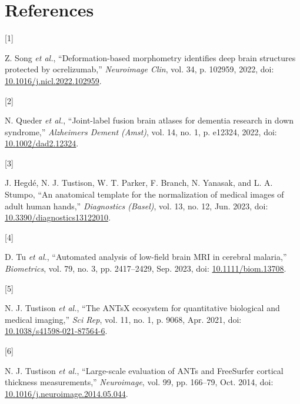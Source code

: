 \documentclass[
  11pt,
]{article}
\newlength{\cslhangindent}
\newlength{\csllabelwidth}
\newenvironment{CSLReferences}[2] %
 {%
  \setlength{\parindent}{0pt}
  \ifodd #1 \everypar{\setlength{\hangindent}{\cslhangindent}}\ignorespaces\fi
  \ifnum #2 > 0
  \setlength{\parskip}{#2\baselineskip}
  \fi
 }%
 {}
\newcommand{\CSLLeftMargin}[1]{\parbox[t]{\csllabelwidth}{#1}}
\newcommand{\CSLRightInline}[1]{\parbox[t]{\linewidth - \csllabelwidth}{#1}\break}
\begin{document}
\hypertarget{references}{%
\section*{References}\label{references}}

\hypertarget{refs}{}
\begin{CSLReferences}{0}{0}
\leavevmode{}%
\CSLLeftMargin{{[}1{]} }
\CSLRightInline{Z. Song \emph{et al.}, {``Deformation-based morphometry
identifies deep brain structures protected by ocrelizumab,''}
\emph{Neuroimage Clin}, vol. 34, p. 102959, 2022, doi:
\href{https://doi.org/10.1016/j.nicl.2022.102959}{10.1016/j.nicl.2022.102959}.}

\leavevmode{}%
\CSLLeftMargin{{[}2{]} }
\CSLRightInline{N. Queder \emph{et al.}, {``Joint-label fusion brain
atlases for dementia research in down syndrome,''} \emph{Alzheimers
Dement (Amst)}, vol. 14, no. 1, p. e12324, 2022, doi:
\href{https://doi.org/10.1002/dad2.12324}{10.1002/dad2.12324}.}

\leavevmode{}%
\CSLLeftMargin{{[}3{]} }
\CSLRightInline{J. Hegdé, N. J. Tustison, W. T. Parker, F. Branch, N.
Yanasak, and L. A. Stumpo, {``An anatomical template for the
normalization of medical images of adult human hands,''}
\emph{Diagnostics (Basel)}, vol. 13, no. 12, Jun. 2023, doi:
\href{https://doi.org/10.3390/diagnostics13122010}{10.3390/diagnostics13122010}.}

\leavevmode{}%
\CSLLeftMargin{{[}4{]} }
\CSLRightInline{D. Tu \emph{et al.}, {``Automated analysis of low-field
brain MRI in cerebral malaria,''} \emph{Biometrics}, vol. 79, no. 3, pp.
2417--2429, Sep. 2023, doi:
\href{https://doi.org/10.1111/biom.13708}{10.1111/biom.13708}.}

\leavevmode{}%
\CSLLeftMargin{{[}5{]} }
\CSLRightInline{N. J. Tustison \emph{et al.}, {``The ANTsX ecosystem for
quantitative biological and medical imaging,''} \emph{Sci Rep}, vol. 11,
no. 1, p. 9068, Apr. 2021, doi:
\href{https://doi.org/10.1038/s41598-021-87564-6}{10.1038/s41598-021-87564-6}.}

\leavevmode{}%
\CSLLeftMargin{{[}6{]} }
\CSLRightInline{N. J. Tustison \emph{et al.}, {``Large-scale evaluation
of {ANTs} and {FreeSurfer} cortical thickness measurements,''}
\emph{Neuroimage}, vol. 99, pp. 166--79, Oct. 2014, doi:
\href{https://doi.org/10.1016/j.neuroimage.2014.05.044}{10.1016/j.neuroimage.2014.05.044}.}


\end{CSLReferences}
\end{document}
